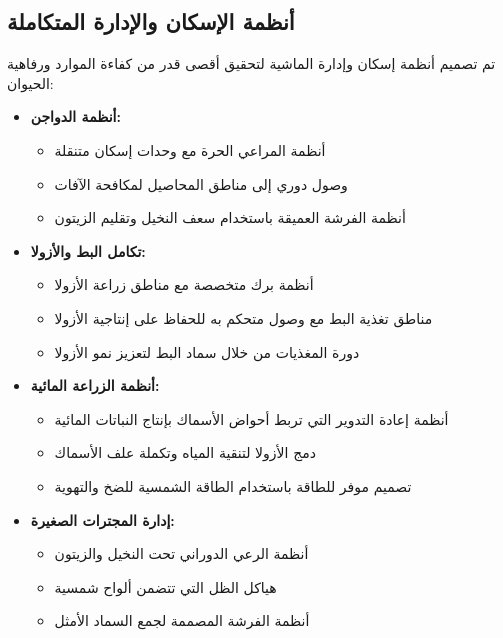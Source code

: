 \subsection{أنظمة الإسكان والإدارة المتكاملة}

تم تصميم أنظمة إسكان وإدارة الماشية لتحقيق أقصى قدر من كفاءة الموارد ورفاهية الحيوان:

\begin{itemize}
    \item \textbf{أنظمة الدواجن:}
    \begin{itemize}
        \item أنظمة المراعي الحرة مع وحدات إسكان متنقلة
        \item وصول دوري إلى مناطق المحاصيل لمكافحة الآفات
        \item أنظمة الفرشة العميقة باستخدام سعف النخيل وتقليم الزيتون
    \end{itemize}
    
    \item \textbf{تكامل البط والأزولا:}
    \begin{itemize}
        \item أنظمة برك متخصصة مع مناطق زراعة الأزولا
        \item مناطق تغذية البط مع وصول متحكم به للحفاظ على إنتاجية الأزولا
        \item دورة المغذيات من خلال سماد البط لتعزيز نمو الأزولا
    \end{itemize}
    
    \item \textbf{أنظمة الزراعة المائية:}
    \begin{itemize}
        \item أنظمة إعادة التدوير التي تربط أحواض الأسماك بإنتاج النباتات المائية
        \item دمج الأزولا لتنقية المياه وتكملة علف الأسماك
        \item تصميم موفر للطاقة باستخدام الطاقة الشمسية للضخ والتهوية
    \end{itemize}
    
    \item \textbf{إدارة المجترات الصغيرة:}
    \begin{itemize}
        \item أنظمة الرعي الدوراني تحت النخيل والزيتون
        \item هياكل الظل التي تتضمن ألواح شمسية
        \item أنظمة الفرشة المصممة لجمع السماد الأمثل
    \end{itemize}
\end{itemize}

